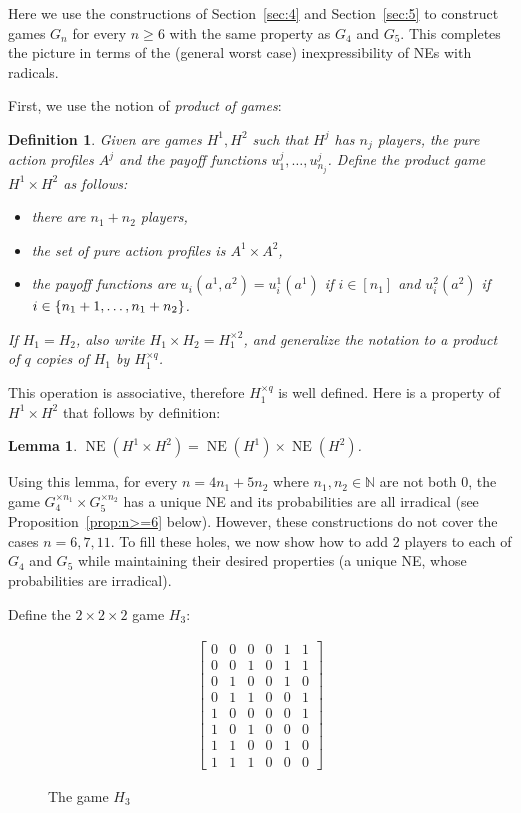 \documentclass[preprint,12pt,authoryear]{elsarticle}
\newtheorem{lemma}[theorem]{Lemma}
\newtheorem{definition}[theorem]{Definition}
\newcommand{\N}{\mathbb{N}}
\DeclarePairedDelimiter{\ios}{\{}{\}}
\newcommand{\s}{\ios*}
\DeclareMathOperator{\NE}{NE}
\begin{document}
Here we use the constructions of Section~\ref{sec:4} and Section~\ref{sec:5} to construct 
games $G_n$ for every $n\ge6$ with the same property as $G_4$ and $G_5$. This completes the 
picture in terms of the (general worst case) inexpressibility of NEs with radicals.

First, we use the notion of \emph{product of games}:

\begin{definition}
  Given are games $H^1,H^2$ such that $H^j$ has $n_j$ players, the pure action 
  profiles $A^j$ and the payoff functions $u^j_1,\ldots,u^j_{n_j}$. Define the 
  \emph{product game} $H^1\times H^2$ as follows:
  \begin{itemize}
    \item there are $n_1+n_2$ players,
    \item the set of pure action profiles is $A^1\times A^2$,
    \item the payoff functions are $u_i(a^1,a^2)=u^1_i(a^1)$ if $i\in[n_1]$ and 
      $u^2_i(a^2)$ if $i\in\s{n_1+1,\ldots,n_1+n_2}$.
  \end{itemize}
  If $H_1=H_2$, also write $H_1\times H_2=H_1^{\times2}$, and generalize the notation to a 
  product of $q$ copies of $H_1$ by $H_1^{\times q}$.
\end{definition}

This operation is associative, therefore $H_1^{\times q}$ is well defined. Here is a property of $H^1\times H^2$ that follows by definition:

\begin{lemma}\label{lmm:product-ne}
  $\NE(H^1\times H^2)=\NE(H^1)\times\NE(H^2)$.
\end{lemma}

Using this lemma, for every $n=4n_1+5n_2$ where $n_1,n_2\in\N$ are not both $0$, the game $G_4^{\times n_1}\times G_5^{\times n_2}$ has a unique NE and its probabilities are all irradical (see Proposition~\ref{prop:n>=6} below). However, these constructions do not cover the cases 
$n=6,7,11$. To fill these holes, we now show how to add 2 players to each of  $G_4$ and 
$G_5$ while maintaining their desired properties (a unique NE, whose probabilities are 
irradical).

Define the $2\times2\times2$ game $H_3$:
\begin{figure}[H]
\centering
\begin{align*}
  \left[\begin{array}{ccc|ccc}
    0&0&0&0&1&1\\
    0&0&1&0&1&1\\
    0&1&0&0&1&0\\
    0&1&1&0&0&1\\
    1&0&0&0&0&1\\
    1&0&1&0&0&0\\
    1&1&0&0&1&0\\
    1&1&1&0&0&0
  \end{array}\right]
\end{align*}
\caption{The game $H_3$}
\label{fig:H3}
\end{figure}
\end{document}
